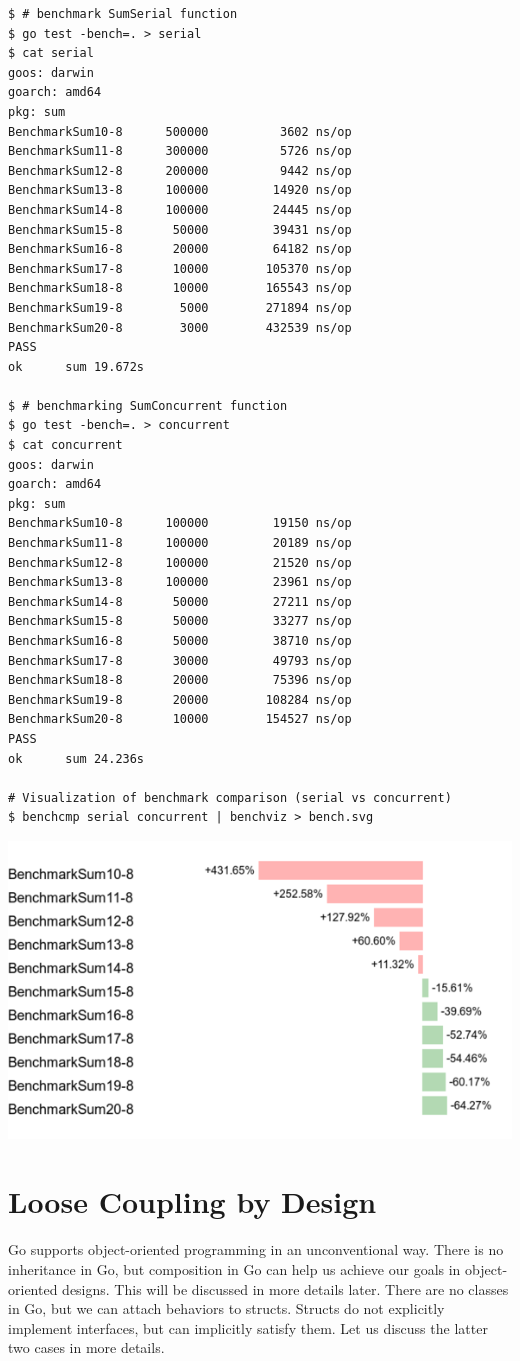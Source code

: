 \documentclass[11pt]{article}
\begin{document}
\begin{verbatim}
$ # benchmark SumSerial function
$ go test -bench=. > serial
$ cat serial
goos: darwin
goarch: amd64
pkg: sum
BenchmarkSum10-8      500000          3602 ns/op
BenchmarkSum11-8      300000          5726 ns/op
BenchmarkSum12-8      200000          9442 ns/op
BenchmarkSum13-8      100000         14920 ns/op
BenchmarkSum14-8      100000         24445 ns/op
BenchmarkSum15-8       50000         39431 ns/op
BenchmarkSum16-8       20000         64182 ns/op
BenchmarkSum17-8       10000        105370 ns/op
BenchmarkSum18-8       10000        165543 ns/op
BenchmarkSum19-8        5000        271894 ns/op
BenchmarkSum20-8        3000        432539 ns/op
PASS
ok      sum 19.672s

$ # benchmarking SumConcurrent function
$ go test -bench=. > concurrent
$ cat concurrent
goos: darwin
goarch: amd64
pkg: sum
BenchmarkSum10-8      100000         19150 ns/op
BenchmarkSum11-8      100000         20189 ns/op
BenchmarkSum12-8      100000         21520 ns/op
BenchmarkSum13-8      100000         23961 ns/op
BenchmarkSum14-8       50000         27211 ns/op
BenchmarkSum15-8       50000         33277 ns/op
BenchmarkSum16-8       50000         38710 ns/op
BenchmarkSum17-8       30000         49793 ns/op
BenchmarkSum18-8       20000         75396 ns/op
BenchmarkSum19-8       20000        108284 ns/op
BenchmarkSum20-8       10000        154527 ns/op
PASS
ok      sum 24.236s

# Visualization of benchmark comparison (serial vs concurrent)
$ benchcmp serial concurrent | benchviz > bench.svg
\end{verbatim}

\includegraphics[width=.9\linewidth]{./code/src/sum/bench1.png}

\section{Loose Coupling by Design}
\label{sec:orgheadline9}
Go supports object-oriented programming in an unconventional way. There is no inheritance in Go, but composition in Go can help us achieve our goals in object-oriented designs. This will be discussed in more details later. There are no classes in Go, but we can attach behaviors to structs. Structs do not explicitly implement interfaces, but can implicitly satisfy them. Let us discuss the latter two cases in more details.
\end{document}
